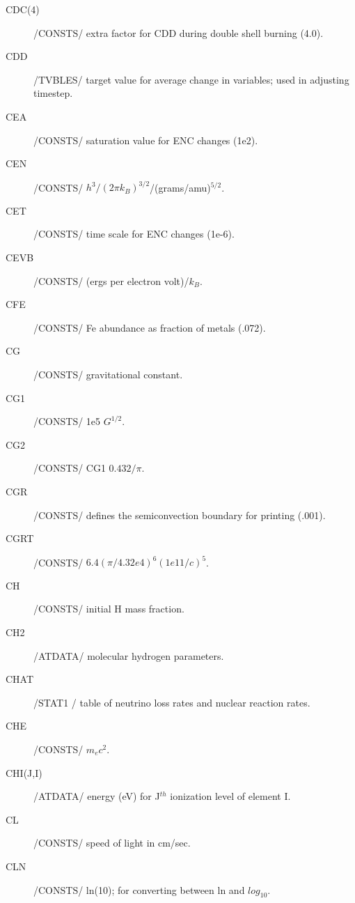 \documentclass{article}
\begin{document}
\begin{description}
	\item[CDC(4)]		/CONSTS/ extra factor for CDD during double shell burning (4.0).

	\item[CDD]		    /TVBLES/ target value for average change in variables; used in adjusting timestep.

	\item[CEA	]	    /CONSTS/ saturation value for ENC changes (1e2).

	\item[CEN]	    /CONSTS/ $h^3/(2 \pi k_B)^{3/2}$/(grams/amu)$^{5/2}$.

	\item[CET]	    /CONSTS/ time scale for ENC changes (1e-6).

	\item[CEVB]		/CONSTS/ (ergs per electron volt)/$k_B$.

	\item[CFE	]	    /CONSTS/ Fe abundance as fraction of metals (.072).

	\item[CG]		    /CONSTS/ gravitational constant.

	\item[CG1]		    /CONSTS/ 1e5 $G^{1/2}$.

	\item[CG2]		    /CONSTS/ CG1 $0.432/ \pi$.

	\item[CGR]		    /CONSTS/ defines the semiconvection boundary for printing (.001).

	\item[CGRT]		/CONSTS/ $6.4 (\pi/4.32e4)^6 (1e11/c)^5$.

	\item[CH]		    /CONSTS/ initial H mass fraction.

	\item[CH2]     	/ATDATA/ molecular hydrogen parameters.

	\item[CHAT]		/STAT1 / table of neutrino loss rates and nuclear reaction rates.

	\item[CHE]     	/CONSTS/ $m_e c^2$.

	\item[CHI(J,I)]    /ATDATA/ energy (eV) for J$^{th}$ ionization level of element I.

	\item[CL]		    /CONSTS/ speed of light in cm/sec.

	\item[CLN]		    /CONSTS/ ln(10); for converting between ln and $log_{10}$.


\end{description}
\end{document}
